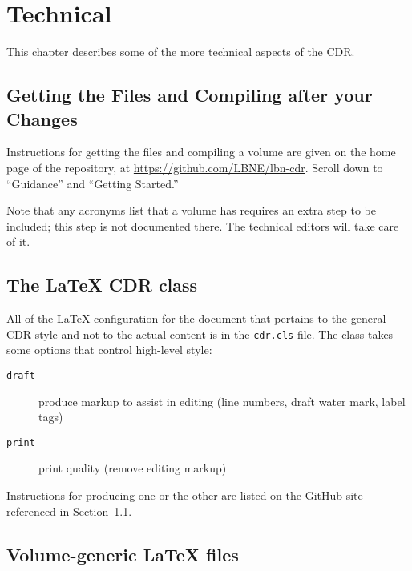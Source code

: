 \chapter{Technical}

This chapter describes some of the more technical aspects of the CDR.

\section{Getting the Files and Compiling after your Changes}
\label{sec:getfiles-compile}

Instructions for getting the files and compiling a volume are given on the home page of the repository, at
\href{https://github.com/LBNE/lbn-cdr}{https://github.com/LBNE/lbn-cdr}. Scroll down to 
``Guidance'' and ``Getting Started.''

Note that any acronyms list that a volume has requires an extra step to be included; this step
is not documented there.
The technical editors will take care of it.

\section{The \LaTeX{} CDR class}

All of the \LaTeX{} configuration for the document that pertains to the general CDR style and not to the actual content is in the \texttt{cdr.cls} file.  The class takes some options that control high-level style:

\begin{description}
\item[\texttt{draft}] produce markup to assist in editing (line numbers, draft water mark, label tags)
\item[\texttt{print}] print quality (remove editing markup)
\end{description}

Instructions for producing one or the other are listed on the GitHub site referenced in Section~\ref{sec:getfiles-compile}.

\section{Volume-generic \LaTeX{} files}

